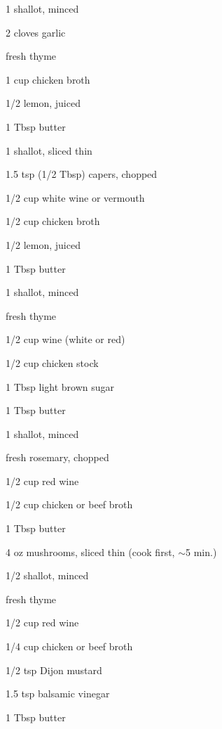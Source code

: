 \documentclass[oneside]{book}  %
\newcommand{\itemNL}{\item[] \hspace{-\labelsep}}  %
\newcommand{\about}{$\sim$}
\begin{document}
\begin{twocols}
  \begin{ingredients}
    \item[1] shallot, minced
    \item[2] cloves garlic
    \itemNL fresh thyme
    \item[1 cup] chicken broth
    \item[1/2] lemon, juiced
    \item[1 Tbsp] butter
  \end{ingredients}

  \begin{ingredients}
    \item[1] shallot, sliced thin
    \item[1.5 tsp (1/2 Tbsp)] capers, chopped
    \item[1/2 cup] white wine or vermouth
    \item[1/2 cup] chicken broth
    \item[1/2] lemon, juiced
    \item[1 Tbsp] butter
  \end{ingredients}

  \begin{ingredients}
    \item[1] shallot, minced
    \itemNL fresh thyme
    \item[1/2 cup] wine (white or red)
    \item[1/2 cup] chicken stock
    \item[1 Tbsp] light brown sugar
    \item[1 Tbsp] butter
  \end{ingredients}

  \columnbreak

  \begin{ingredients}
    \item[1] shallot, minced
    \itemNL fresh rosemary, chopped
    \item[1/2 cup] red wine
    \item[1/2 cup] chicken or beef broth
    \item[1 Tbsp] butter
  \end{ingredients}

  \begin{ingredients}
    \item[4 oz] mushrooms, sliced thin (cook first, \about 5 min.)
    \item[1/2] shallot, minced
    \itemNL fresh thyme
    \item[1/2 cup] red wine
    \item[1/4 cup] chicken or beef broth
    \item[1/2 tsp] Dijon mustard
    \item[1.5 tsp] balsamic vinegar
    \item[1 Tbsp] butter
  \end{ingredients}


\end{twocols}
\end{document}
